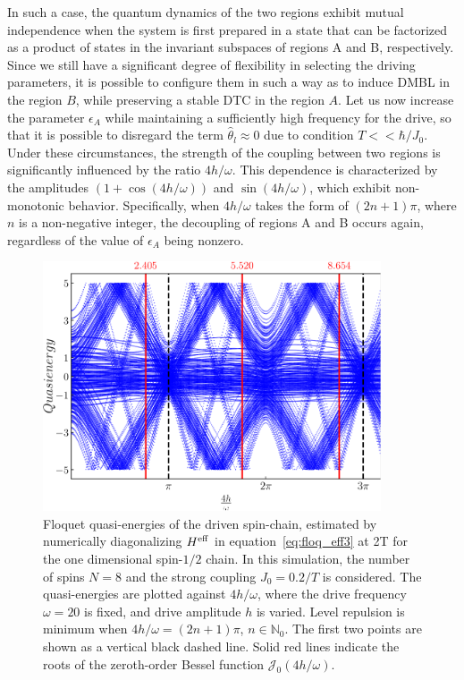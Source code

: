 \documentclass[12pt]{iopart}
\begin{document}
In such a case, the quantum dynamics of the two regions exhibit mutual independence when the system is first prepared in a state that can be factorized as a product of states in the invariant subspaces of regions A and B, respectively. Since we still have a significant degree of flexibility in selecting the driving parameters, it is possible to configure them in such a way as to induce DMBL in the region $B$, while preserving a stable DTC in the region $A$. Let us now increase the parameter $\epsilon_A$ while maintaining a sufficiently high frequency for the drive, so that it is possible to disregard the term $\hat{\theta}_l \approx 0$ due to condition $T<<\hbar/J_0$. Under these circumstances, the strength of the coupling between two regions is significantly influenced by the ratio $4h/\omega$. This dependence is characterized by the amplitudes $(1+\cos(4h/\omega))$ and $\sin(4h/\omega)$, which exhibit non-monotonic behavior. Specifically, when $4h/\omega$ takes the form of $(2n+1)\pi$, where $n$ is a non-negative integer, the decoupling of regions A and B occurs again, regardless of the value of $\epsilon_A$ being nonzero.
\begin{figure}[h!]
    \centering
    \includegraphics[width=10cm]{figure3_temp.pdf}
    \caption{Floquet quasi-energies of the driven spin-chain,  estimated by numerically diagonalizing $H^{\rm eff}$ in equation~\eqref{eq:floq_eff3} at 2T for the one dimensional spin-$1/2$ chain. In this simulation, the number of spins $N=8$ and the strong coupling $J_0=0.2/T$ is considered. The quasi-energies are plotted against $4h/\omega$, where the drive frequency $\omega=20$ is fixed, and drive amplitude $h$ is varied. Level repulsion is minimum when ${4h}/{\omega} = (2n+1)\pi$, $n\in \mathbb{N}_0$. The first two points are shown as a vertical black dashed line. Solid red lines indicate the roots of the zeroth-order Bessel function $\mathcal{J}_0(4h/\omega)$.}
    \label{Fig:quasienergy_new}
\end{figure}	
\end{document}
